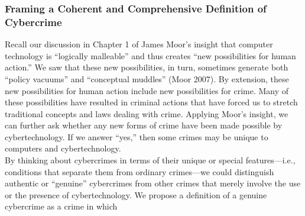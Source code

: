\documentclass[12pt]{article}
\theoremstyle{definition}
\begin{document}
\subsubsection{Framing a Coherent and Comprehensive Definition of Cybercrime}
Recall our discussion in Chapter 1 of James Moor’s insight that computer technology is
“logically malleable” and thus creates “new possibilities for human action.” We saw that
these new possibilities, in turn, sometimes generate both “policy vacuums” and
“conceptual muddles” (Moor 2007). By extension, these new possibilities for human
action include new possibilities for crime. Many of these possibilities have resulted in
criminal actions that have forced us to stretch traditional concepts and laws dealing with
crime. Applying Moor’s insight, we can further ask whether any new forms of crime have
been made possible by cybertechnology. If we answer “yes,” then some crimes may be
unique to computers and cybertechnology.\\
By thinking about cybercrimes in terms of their unique or special features—i.e.,
conditions that separate them from ordinary crimes—we could distinguish authentic or
“genuine” cybercrimes from other crimes that merely involve the use or the presence of
cybertechnology. We propose a definition of a genuine cybercrime as a crime in which\\
\\
\end{document}
